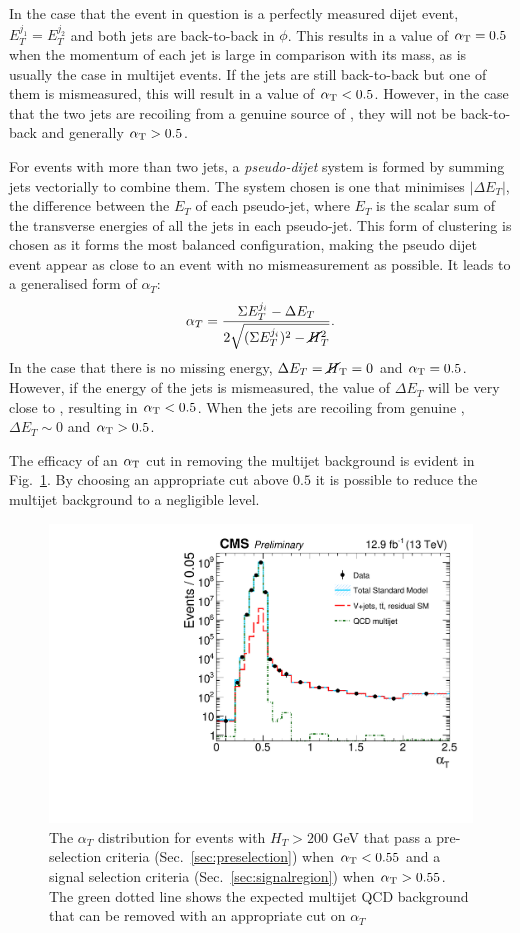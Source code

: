 In the case that the event in question is a perfectly measured dijet
event, $E_T^{j_1}=E_T^{j_2}$ and both jets are back-to-back in $\phi$.
This results in a value of $\alpha_{\text{T}}=0.5$ when the momentum of each jet
is large in comparison with its mass, as is usually the case in
\QCD multijet events. If the jets are still back-to-back but one of
them is mismeasured, this will result in a value of $\alpha_{\text{T}}<0.5$.
However, in the case that the two jets are recoiling from a genuine
source of \MET, they will not be back-to-back and generally $\alpha_{\text{T}}>0.5$.

For events with more than two jets, a \emph{pseudo-dijet} system is
formed by summing jets vectorially to combine them.  The system chosen
is one that minimises $|\Delta E_T|$, the difference between the $E_T$
of each pseudo-jet, where $E_T$ is the scalar sum of the transverse
energies of all the jets in each pseudo-jet. This form of clustering
is chosen as it forms the most balanced configuration, making the
pseudo dijet event appear as close to an event with no mismeasurement
as possible. It leads to a generalised form of $\alpha_T$: 
\begin{equation}
\alpha_T=\frac{\Sigma E_T^{j_i}-\Delta
E_T}{2\sqrt{(\Sigma E_T^{j_i})^2-\cancel{H}_T^2}}.
\end{equation} 
In the case that there is no missing energy, $\Delta
E_T=\mbox{$\cancel{H}_\text{T}$}=0$ and $\alpha_{\text{T}}=0.5$. However, if the energy of the jets is
mismeasured, the value of $\Delta E_T$ will be very close to \MET,
resulting in $\alpha_{\text{T}}<0.5$. When the jets are recoiling from genuine
\MET, $\Delta E_T\sim 0$ and $\alpha_{\text{T}}>0.5$.
  
The efficacy of an $\alpha_{\text{T}}$ cut in removing the \QCD multijet
background is evident in Fig.~\ref{fig:alphaT}. By
choosing an appropriate cut above $0.5$ it is possible to reduce the
multijet background to a negligible level.

\begin{figure}
	\begin{center}
		\includegraphics[width=0.7\linewidth]{figs/analysis/eventSelection/CMS-PAS-SUS-16-016_Figure-aux_001}%
	\end{center}
  \caption{The $\alpha_T$ distribution for events with $H_T>200$ GeV
  that pass a pre-selection criteria (Sec.~\ref{sec:preselection}) when
  $\alpha_{\text{T}}<0.55$ and a signal selection criteria
  (Sec.~\ref{sec:signalregion}) when
  $\alpha_{\text{T}}>0.55$. The green dotted line shows the expected multijet
  QCD background that can be removed with an appropriate cut on
  $\alpha_T$}
	\label{fig:alphaT}
\end{figure}

